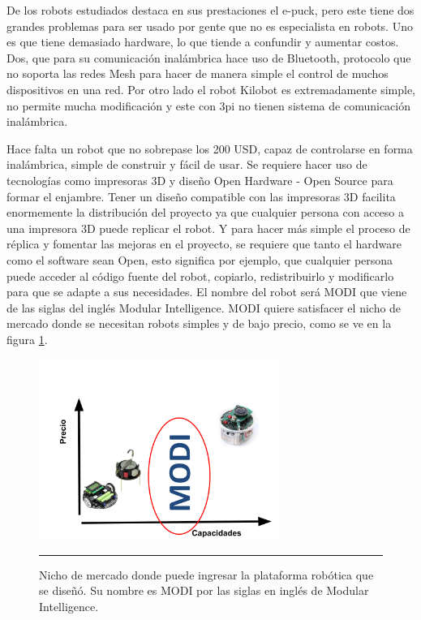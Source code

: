 De los robots estudiados destaca en sus prestaciones el e-puck, pero este tiene dos grandes problemas para ser usado por gente que no es especialista en robots. Uno es que tiene demasiado hardware, lo que tiende a confundir y aumentar costos. Dos, que para su comunicación inalámbrica hace uso de Bluetooth, protocolo que no soporta las redes Mesh para hacer de manera simple el control de muchos dispositivos en una red. Por otro lado el robot Kilobot es extremadamente simple, no permite mucha modificación y este con 3pi no tienen sistema de comunicación inalámbrica.

Hace falta un robot que no sobrepase los 200 USD, capaz de controlarse en forma inalámbrica, simple de construir y fácil de usar. Se requiere hacer uso de tecnologías como impresoras 3D y diseño Open Hardware - Open Source para formar el enjambre. Tener un diseño compatible con las impresoras 3D facilita enormemente la distribución del proyecto ya que cualquier persona con acceso a una impresora 3D puede replicar el robot. Y para hacer más simple el proceso de réplica y fomentar las mejoras en el proyecto, se requiere que tanto el hardware como el software sean Open, esto significa por ejemplo, que cualquier persona puede acceder al código fuente del robot, copiarlo, redistribuirlo y modificarlo para que se adapte a sus necesidades. El nombre del robot será MODI que viene de las siglas del inglés Modular Intelligence. MODI quiere satisfacer el nicho de mercado donde se necesitan robots simples y de bajo precio, como se ve en la figura \ref{fig:nicho}.

\begin{figure}[htbp]
	\centering
		\includegraphics[width=0.7\textwidth]{./Figures/nicho.png}
		\rule{35em}{0.5pt}
	\caption[Nicho de mercado]{Nicho de mercado donde puede ingresar la plataforma robótica que se diseñó. Su nombre es MODI por las siglas en inglés de Modular Intelligence.}
	\label{fig:nicho}
\end{figure}



